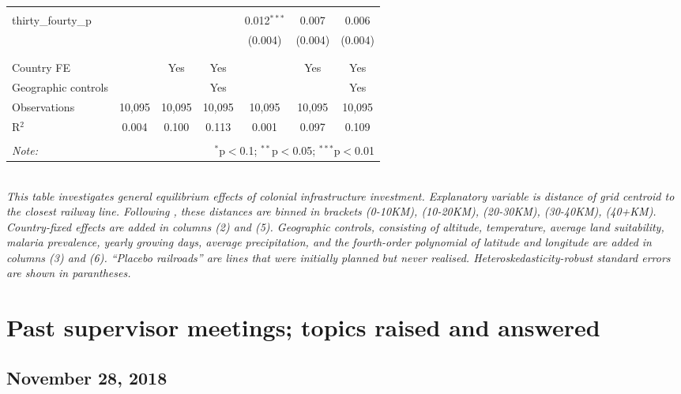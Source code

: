 \documentclass[11pt, oneside]{article}   	%
\begin{document}
\begin{table}[]
{\begin{tabular}{@{\extracolsep{5pt}}lcccccc}
    & & & & & & \\
   thirty\_fourty\_p &  &  &  & 0.012$^{***}$ & 0.007 & 0.006 \\
    &  &  &  & (0.004) & (0.004) & (0.004) \\
    & & & & & & \\
  \hline \\[-1.8ex]
  Country FE &  & Yes & Yes &  & Yes & Yes \\
  Geographic controls &  &  & Yes &  &  & Yes \\
  Observations & 10,095 & 10,095 & 10,095 & 10,095 & 10,095 & 10,095 \\
  R$^{2}$ & 0.004 & 0.100 & 0.113 & 0.001 & 0.097 & 0.109 \\
  \hline
  \hline \\[-1.8ex]
  \textit{Note:}  & \multicolumn{6}{r}{$^{*}$p$<$0.1; $^{**}$p$<$0.05; $^{***}$p$<$0.01} \\
  \end{tabular}

}

\justify
\textit{\\ \footnotesize This table investigates general equilibrium effects of colonial infrastructure investment. Explanatory variable is distance of grid centroid to the closest railway line. Following \cite{jedwab_permanent_2016}, these distances are binned in brackets (0-10KM), (10-20KM), (20-30KM), (30-40KM), (40+KM). Country-fixed effects are added in columns (2) and (5). Geographic controls, consisting of altitude, temperature, average land suitability, malaria prevalence, yearly growing days, average precipitation, and the fourth-order polynomial of latitude and longitude are added in columns (3) and (6). ``Placebo railroads'' are lines that were initially planned but never realised. Heteroskedasticity-robust standard errors are shown in parantheses.}
\end{table}


\section*{Past supervisor meetings; topics raised and answered}

\subsection*{November 28, 2018}
\end{document}
